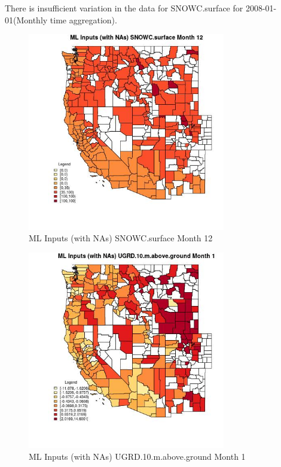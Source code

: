 There is insufficient variation in the data for SNOWC.surface for 2008-01-01(Monthly time aggregation). 
 

\begin{figure} 
\centering  
\includegraphics[width=0.77\textwidth]{Code_Outputs/Report_ML_input_PM25_Step4_part_f_de_duplicated_aves_prioritize_24hr_obswNAs_CountySNOWCsurfacemedianMonth12.jpg} 
\caption{\label{fig:Report_ML_input_PM25_Step4_part_f_de_duplicated_aves_prioritize_24hr_obswNAsCountySNOWCsurfacemedianMonth12}ML Inputs (with NAs) SNOWC.surface Month 12} 
\end{figure} 
 

\begin{figure} 
\centering  
\includegraphics[width=0.77\textwidth]{Code_Outputs/Report_ML_input_PM25_Step4_part_f_de_duplicated_aves_prioritize_24hr_obswNAs_CountyUGRD10mabovegroundmedianMonth1.jpg} 
\caption{\label{fig:Report_ML_input_PM25_Step4_part_f_de_duplicated_aves_prioritize_24hr_obswNAsCountyUGRD10mabovegroundmedianMonth1}ML Inputs (with NAs) UGRD.10.m.above.ground Month 1} 
\end{figure} 
 

